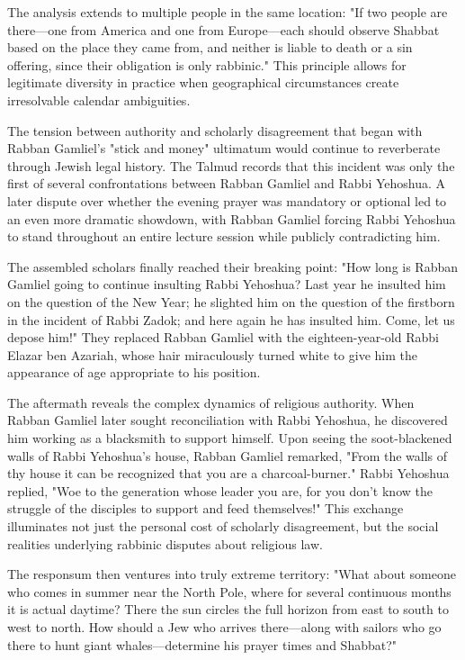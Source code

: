 The analysis extends to multiple people in the same location: "If two people are there—one from America and one from Europe—each should observe Shabbat based on the place they came from, and neither is liable to death or a sin offering, since their obligation is only rabbinic." This principle allows for legitimate diversity in practice when geographical circumstances create irresolvable calendar ambiguities.

The tension between authority and scholarly disagreement that began with Rabban Gamliel's "stick and money" ultimatum would continue to reverberate through Jewish legal history. The Talmud records that this incident was only the first of several confrontations between Rabban Gamliel and Rabbi Yehoshua. A later dispute over whether the evening prayer was mandatory or optional led to an even more dramatic showdown, with Rabban Gamliel forcing Rabbi Yehoshua to stand throughout an entire lecture session while publicly contradicting him.

The assembled scholars finally reached their breaking point: "How long is Rabban Gamliel going to continue insulting Rabbi Yehoshua? Last year he insulted him on the question of the New Year; he slighted him on the question of the firstborn in the incident of Rabbi Zadok; and here again he has insulted him. Come, let us depose him!" They replaced Rabban Gamliel with the eighteen-year-old Rabbi Elazar ben Azariah, whose hair miraculously turned white to give him the appearance of age appropriate to his position.

The aftermath reveals the complex dynamics of religious authority. When Rabban Gamliel later sought reconciliation with Rabbi Yehoshua, he discovered him working as a blacksmith to support himself. Upon seeing the soot-blackened walls of Rabbi Yehoshua's house, Rabban Gamliel remarked, "From the walls of thy house it can be recognized that you are a charcoal-burner." Rabbi Yehoshua replied, "Woe to the generation whose leader you are, for you don't know the struggle of the disciples to support and feed themselves!" This exchange illuminates not just the personal cost of scholarly disagreement, but the social realities underlying rabbinic disputes about religious law.

The responsum then ventures into truly extreme territory: "What about someone who comes in summer near the North Pole, where for several continuous months it is actual daytime? There the sun circles the full horizon from east to south to west to north. How should a Jew who arrives there—along with sailors who go there to hunt giant whales—determine his prayer times and Shabbat?"

